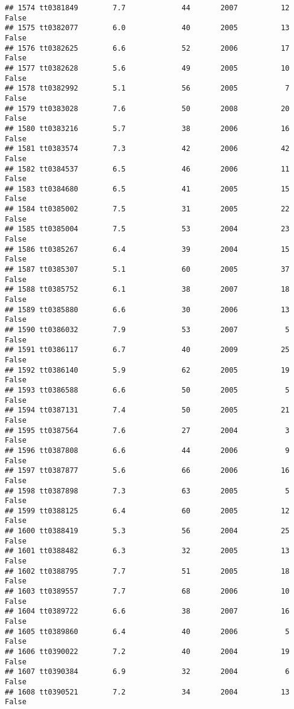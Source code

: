 \documentclass[
]{article}
\begin{document}
\begin{verbatim}
## 1574 tt0381849        7.7             44       2007          12   False
## 1575 tt0382077        6.0             40       2005          13   False
## 1576 tt0382625        6.6             52       2006          17   False
## 1577 tt0382628        5.6             49       2005          10   False
## 1578 tt0382992        5.1             56       2005           7   False
## 1579 tt0383028        7.6             50       2008          20   False
## 1580 tt0383216        5.7             38       2006          16   False
## 1581 tt0383574        7.3             42       2006          42   False
## 1582 tt0384537        6.5             46       2006          11   False
## 1583 tt0384680        6.5             41       2005          15   False
## 1584 tt0385002        7.5             31       2005          22   False
## 1585 tt0385004        7.5             53       2004          23   False
## 1586 tt0385267        6.4             39       2004          15   False
## 1587 tt0385307        5.1             60       2005          37   False
## 1588 tt0385752        6.1             38       2007          18   False
## 1589 tt0385880        6.6             30       2006          13   False
## 1590 tt0386032        7.9             53       2007           5   False
## 1591 tt0386117        6.7             40       2009          25   False
## 1592 tt0386140        5.9             62       2005          19   False
## 1593 tt0386588        6.6             50       2005           5   False
## 1594 tt0387131        7.4             50       2005          21   False
## 1595 tt0387564        7.6             27       2004           3   False
## 1596 tt0387808        6.6             44       2006           9   False
## 1597 tt0387877        5.6             66       2006          16   False
## 1598 tt0387898        7.3             63       2005           5   False
## 1599 tt0388125        6.4             60       2005          12   False
## 1600 tt0388419        5.3             56       2004          25   False
## 1601 tt0388482        6.3             32       2005          13   False
## 1602 tt0388795        7.7             51       2005          18   False
## 1603 tt0389557        7.7             68       2006          10   False
## 1604 tt0389722        6.6             38       2007          16   False
## 1605 tt0389860        6.4             40       2006           5   False
## 1606 tt0390022        7.2             40       2004          19   False
## 1607 tt0390384        6.9             32       2004           6   False
## 1608 tt0390521        7.2             34       2004          13   False

\end{verbatim}
\end{document}
